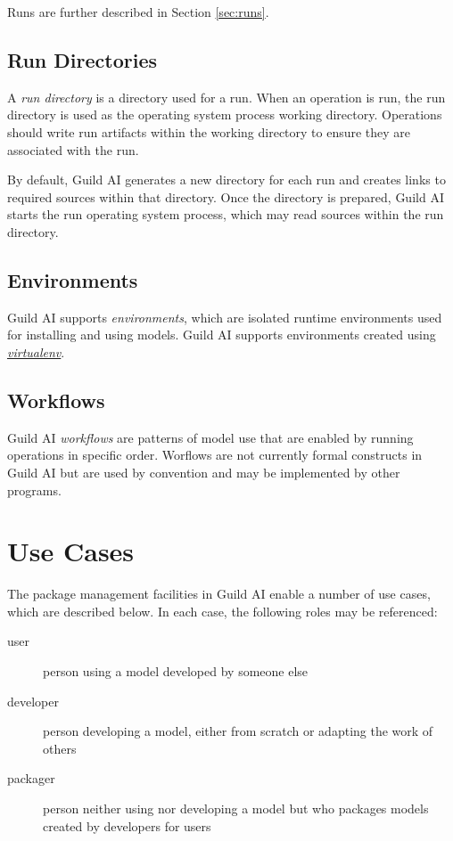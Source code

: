 \documentclass{article}
\begin{document}
Runs are further described in Section \ref{sec:runs}.

\subsection{Run Directories}
\label{sec:run-dir}

A \emph{run directory} is a directory used for a run. When an
operation is run, the run directory is used as the operating system
process working directory. Operations should write run artifacts
within the working directory to ensure they are associated with the
run.

By default, Guild AI generates a new directory for each run and
creates links to required sources within that directory. Once the
directory is prepared, Guild AI starts the run operating system
process, which may read sources within the run directory.

\subsection{Environments}

Guild AI supports \emph{environments}, which are isolated runtime
environments used for installing and using models. Guild AI supports
environments created using
\href{https://virtualenv.pypa.io}{\emph{virtualenv}}.

\subsection{Workflows}

Guild AI \emph{workflows} are patterns of model use that are enabled
by running operations in specific order. Worflows are not currently
formal constructs in Guild AI but are used by convention and may be
implemented by other programs.

\section{Use Cases}
\label{sec:use-cases}

The package management facilities in Guild AI enable a number of use
cases, which are described below. In each case, the following roles
may be referenced:

\begin{description}
\item[user] person using a model developed by someone else
\item[developer] person developing a model, either from scratch or
  adapting the work of others
\item[packager] person neither using nor developing a model but who
  packages models created by developers for users
\end{description}
\end{document}
